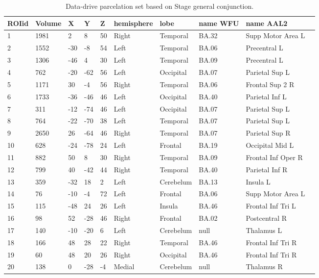\begin{table}
\centering
\begin{tabular}[0.2em]{@{}llllllllll@{}}\toprule
ROIid & Volume & X & Y & Z & hemisphere & lobe & name WFU & name AAL2\\\toprule[0.2em]
1 & 1981 & 2 & 8 & 50 & Right & Temporal & BA.32 & Supp Motor Area L \\\midrule
2 & 1552 & -30 & -8 & 54 & Left & Temporal & BA.06 & Precentral L \\\midrule
3 & 1306 & -46 & 4 & 30 & Left & Temporal & BA.09 & Precentral L \\\midrule
4 & 762 & -20 & -62 & 56 & Left & Occipital & BA.07 & Parietal Sup L \\\midrule
5 & 1171 & 30 & -4 & 56 & Right & Temporal & BA.06 & Frontal Sup 2 R \\\midrule
6 & 1733 & -36 & -46 & 46 & Left & Occipital & BA.40 & Parietal Inf L \\\midrule
7 & 311 & -12 & -74 & 46 & Left & Occipital & BA.07 & Parietal Sup L \\\midrule
8 & 764 & -22 & -70 & 38 & Left & Temporal & BA.07 & Parietal Sup L \\\midrule
9 & 2650 & 26 & -64 & 46 & Right & Temporal & BA.07 & Parietal Sup R \\\midrule
10 & 628 & -24 & -78 & 24 & Left & Frontal & BA.19 & Occipital Mid L \\\midrule
11 & 882 & 50 & 8 & 30 & Right & Temporal & BA.09 & Frontal Inf Oper R \\\midrule
12 & 799 & 40 & -42 & 44 & Right & Temporal & BA.40 & Parietal Inf R \\\midrule
13 & 359 & -32 & 18 & 2 & Left & Cerebelum & BA.13 & Insula L \\\midrule
14 & 76 & -10 & -4 & 72 & Left & Frontal & BA.06 & Supp Motor Area L \\\midrule
15 & 115 & -48 & 24 & 26 & Left & Insula & BA.46 & Frontal Inf Tri L \\\midrule
16 & 98 & 52 & -28 & 46 & Right & Frontal & BA.02 & Postcentral R \\\midrule
17 & 140 & -10 & -20 & 6 & Left & Cerebelum & null & Thalamus L \\\midrule
18 & 166 & 48 & 28 & 22 & Right & Temporal & BA.46 & Frontal Inf Tri R \\\midrule
19 & 60 & 48 & 20 & 26 & Right & Occipital & BA.46 & Frontal Inf Tri R \\\midrule
20 & 138 & 0 & -28 & -4 & Medial & Cerebelum & null & Thalamus R \\\bottomrule[0.2em]
\end{tabular}
\caption{Data-drive parcelation set based on Stage general conjunction.\label{tabel:SGset}}
\end{table}
